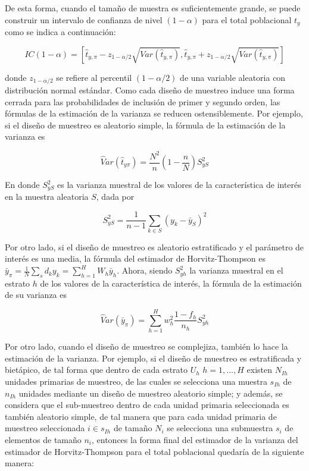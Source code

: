 \documentclass[
  10pt,
  spanish,
]{book}
\begin{document}
De esta forma, cuando el tamaño de muestra es suficientemente grande, se puede construir un intervalo de confianza de nivel \((1-\alpha)\) para el total poblacional \(t_y\) como se indica a continuación:

\[
IC(1-\alpha)=\left[\hat{t}_{y,\pi}-z_{1-\alpha / 2}\sqrt{ Var(\hat{t}_{y,\pi})},\hat{t}_{y,\pi}+z_{1-\alpha / 2}\sqrt{Var(\hat{t}_{y,\pi})}\right]
\]

donde \(z_{1-\alpha / 2}\) se refiere al percentil \((1-\alpha / 2)\) de una variable aleatoria con distribución normal estándar. Como cada diseño de muestreo induce una forma cerrada para las probabilidades de inclusión de primer y segundo orden, las fórmulas de la estimación de la varianza se reducen ostensiblemente. Por ejemplo, si el diseño de muestreo es aleatorio simple, la fórmula de la estimación de la varianza es

\[
 \widehat Var(\hat{t}_{y\pi}) = \frac{N^2}{n} \left( 1- \frac{n}{N} \right) S^2_{yS}
 \]

En donde \(S^2_{yS}\) es la varianza muestral de los valores de la característica de interés en la muestra aleatoria \(S\), dada por

\[
S^2_{yS}=\frac{1}{n-1}\sum_{k\in S}(y_k-\bar{y}_S)^2
\]

Por otro lado, si el diseño de muestreo es aleatorio estratificado y el parámetro de interés es una media, la fórmula del estimador de Horvitz-Thompson es \(\bar{y}_{\pi} = \frac{1}{N}\sum_s d_k y_k = \sum_{h=1}^H W_h \bar{y}_h\). Ahora, siendo \(S^2_{yh}\) la varianza muestral en el estrato \(h\) de los valores de la característica de interés, la fórmula de la estimación de su varianza es

\[
\widehat Var(\bar{y}_{\pi}) = \sum_{h=1}^H w_h^2 \frac{1-f_h}{n_h}S^2_{yh}
 \]

Por otro lado, cuando el diseño de muestreo se complejiza, también lo hace la estimación de la varianza. Por ejemplo, si el diseño de muestreo es estratificada y bietápico, de tal forma que dentro de cada estrato \(U_h\) \(h=1,\ldots, H\) existen \(N_{Ih}\) unidades primarias de muestreo, de las cuales se selecciona una muestra \(s_{Ih}\) de \(n_{Ih}\) unidades mediante un diseño de muestreo aleatorio simple; y además, se considera que el sub-muestreo dentro de cada unidad primaria seleccionada es también aleatorio simple, de tal manera que para cada unidad primaria de muestreo seleccionada \(i\in s_{Ih}\) de tamaño \(N_i\) se selecciona una submuestra \(s_i\) de elementos de tamaño \(n_i\), entonces la forma final del estimador de la varianza del estimador de Horvitz-Thompson para el total poblacional quedaría de la siguiente manera:
\end{document}
